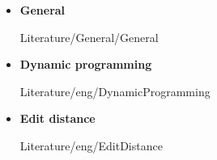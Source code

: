 \begin{frame}{\LectureFurtherLiterature}
  \begin{itemize}
    \item
      \textbf{General}
      \begin{btSect}{Literature/General/General}
        \btPrintAll
      \end{btSect}
  \end{itemize}
\end{frame}


\begin{frame}{\LectureFurtherLiterature}
  \begin{itemize}
    \item
      \textbf{Dynamic programming}
      \begin{btSect}{Literature/eng/DynamicProgramming}
        \btPrintAll
      \end{btSect}
    \item
      \textbf{Edit distance}
      \begin{btSect}{Literature/eng/EditDistance}
        \btPrintAll
      \end{btSect}
  \end{itemize}
\end{frame}